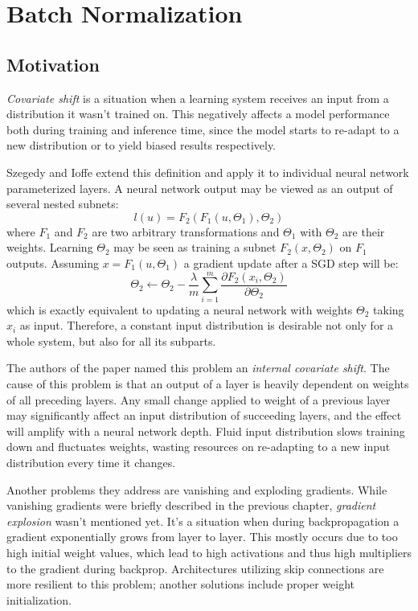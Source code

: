 \documentclass[thesis=B,english]{FITthesis}[2019/12/23]
\begin{document}
\section{Batch Normalization}

\subsection{Motivation}

\textit{Covariate shift} is a situation when a learning system receives an input from a distribution it wasn't trained on\cite{covariate_shift}. This negatively affects a model performance both during training and inference time, since the model starts to re-adapt to a new distribution or to yield biased results respectively. 

Szegedy and Ioffe\cite{batchnorm} extend this definition and apply it to individual neural network parameterized layers. A neural network output may be viewed as an output of several nested subnets:
\[l(u) = F_2(F_1(u, \Theta_1), \Theta_2)\]
where $F_1$ and $F_2$ are two arbitrary transformations and $\Theta_1$ with $\Theta_2$ are their weights. Learning $\Theta_2$ may be seen as training a subnet $F_2(x, \Theta_2)$ on $F_1$ outputs. Assuming $x = F_1(u, \Theta_1)$ a gradient update after a SGD step will be:
\[\Theta_2 \longleftarrow \Theta_2 - \frac{\lambda}{m}  \sum_{i=1}^{m} \frac{\partial F_2(x_i, \Theta_2)}{\partial \Theta_2}\]
which is exactly equivalent to updating a neural network with weights $\Theta_2$ taking $x_i$ as input. Therefore, a constant input distribution is desirable not only for a whole system, but also for all its subparts.

The authors of the paper named this problem an \textit{internal covariate shift}. The cause of this problem is that an output of a layer is heavily dependent on weights of all preceding layers. Any small change applied to weight of a previous layer may significantly affect an input distribution of succeeding layers, and the effect will amplify with a neural network depth. Fluid input distribution slows training down and fluctuates weights, wasting resources on re-adapting to a new input distribution every time it changes.

Another problems they address are vanishing and exploding gradients. While vanishing gradients were briefly described in the previous chapter, \textit{gradient explosion} wasn't mentioned yet. It's a situation when during backpropagation a gradient exponentially grows from layer to layer. This mostly occurs due to too high initial weight values, which lead to high activations and thus high multipliers to the gradient during backprop. Architectures utilizing skip connections are more resilient to this problem\cite{exploding_gradient}; another solutions include proper weight initialization\cite{xavier_init}\cite{he_init}.
\end{document}

